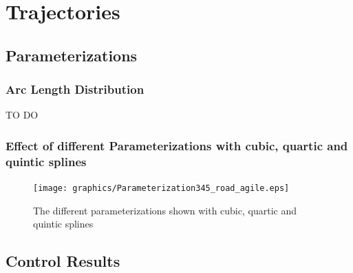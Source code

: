 
\chapter{Trajectories}
\label{cha:appendix}

\section{Parameterizations}
\subsection{Arc Length Distribution}
\label{subsec:arcLengthDistribution}
TO DO
\subsection{Effect of different Parameterizations with cubic, quartic and quintic splines}
\label{subsec:parameterization_degree}

\begin{figure}[H]
  \begin{minipage}[t]{0.9\textwidth}
    \texttt{[image: graphics/Parameterization345\_road\_agile.eps]}
  \end{minipage}
  \caption{The different parameterizations shown with cubic, quartic and quintic splines}
  \label{fig:parameterization_cqq}
\end{figure}

\section{Control Results}
\label{sec:app_trajectory_control_results}

